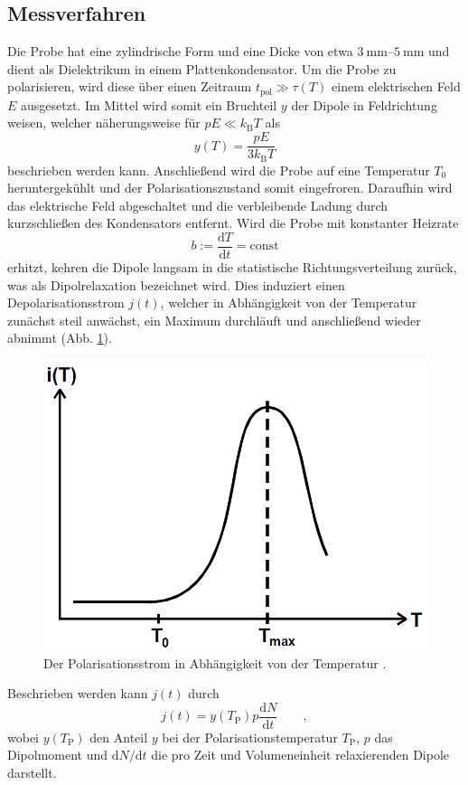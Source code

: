 \subsection{Messverfahren} %
\label{sub:messverfahren}

Die Probe hat eine zylindrische Form und eine Dicke von etwa $\SIrange{3}{5}{\milli\meter}$ und dient als Dielektrikum in einem Plattenkondensator.
Um die Probe zu polarisieren, wird diese über einen Zeitraum $t_{\text{pol}} \gg \tau(T)$ einem elektrischen Feld $E$ ausgesetzt.
Im Mittel wird somit ein Bruchteil $y$ der Dipole in Feldrichtung weisen, welcher näherungsweise für $pE \ll k_\text{B} T$ als
\begin{equation}
    y(T) = \frac{p E}{3 k_\text{B} T} \label{y_t}
\end{equation}
beschrieben werden kann.
Anschließend wird die Probe auf eine Temperatur $T_0$ heruntergekühlt und der Polarisationszustand somit eingefroren.
Daraufhin wird das elektrische Feld abgeschaltet und die verbleibende Ladung durch kurzschließen des Kondensators entfernt.
Wird die Probe mit konstanter Heizrate
\begin{equation}
    b := \frac{\mathrm{d}T}{\mathrm{d}t} = \text{const}
\end{equation}
erhitzt, kehren die Dipole langsam in die statistische Richtungsverteilung zurück, was als Dipolrelaxation bezeichnet wird.
Dies induziert einen Depolarisationsstrom $j(t)$, welcher in Abhängigkeit von der Temperatur zunächst steil anwächst, ein Maximum durchläuft und anschließend wieder abnimmt (Abb. \ref{fig:pol_strom}).
\begin{figure}
    \centering
    \includegraphics[width = 0.5\linewidth]{img/pol_strom.PNG}
    \caption{Der Polarisationsstrom in Abhängigkeit von der Temperatur \cite{V48}.}
    \label{fig:pol_strom}
\end{figure}
Beschrieben werden kann $j(t)$ durch
\begin{equation}
    j(t) = y(T_\mathrm{P}) p \frac{\mathrm{d}N}{\mathrm{d}t} \qquad,
\end{equation}
wobei $y(T_\mathrm{P})$ den Anteil $y$ bei der Polarisationstemperatur $T_\mathrm{P}$, $p$ das Dipolmoment und $\mathrm{d}N/\mathrm{d}t$ die pro Zeit und Volumeneinheit relaxierenden Dipole darstellt.

